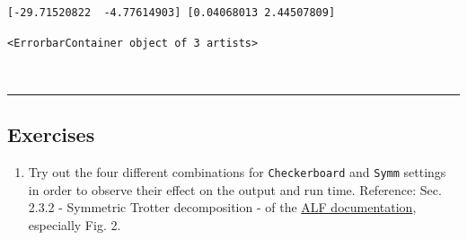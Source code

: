 \documentclass[11pt]{article}
\makeatletter
\providecommand{\tightlist}{%
      \setlength{\itemsep}{0pt}\setlength{\parskip}{0pt}}
\newcommand{\boxspacing}{\kern\kvtcb@left@rule\kern\kvtcb@boxsep}
\newcommand{\prompt}[4]{
        \ttfamily\llap{{\color{#2}[#3]:\hspace{3pt}#4}}\vspace{-\baselineskip}
    }
\makeatother
\begin{document}
    \begin{Verbatim}[commandchars=\\\{\}]
[-29.71520822  -4.77614903] [0.04068013 2.44507809]
    \end{Verbatim}

            \begin{tcolorbox}[breakable, size=fbox, boxrule=.5pt, pad at break*=1mm, opacityfill=0]
\prompt{Out}{outcolor}{7}{\boxspacing}
\begin{Verbatim}[commandchars=\\\{\}]
<ErrorbarContainer object of 3 artists>
\end{Verbatim}
\end{tcolorbox}
        
    \begin{center}
    \end{center}
    { \hspace*{\fill} \\}
    
    \begin{center}\rule{0.5\linewidth}{0.5pt}\end{center}

\hypertarget{exercises}{%
\subsection{Exercises}\label{exercises}}

\begin{enumerate}
\def\labelenumi{\arabic{enumi}.}
\tightlist
\item
  Try out the four different combinations for \texttt{Checkerboard} and
  \texttt{Symm} settings in order to observe their effect on the output
  and run time. Reference: Sec. 2.3.2 - Symmetric Trotter decomposition
  - of the
  \href{https://git.physik.uni-wuerzburg.de/ALF/ALF/-/blob/master/Documentation/doc.pdf}{ALF
  documentation}, especially Fig. 2.
\end{enumerate}


    
    
    
\end{document}
